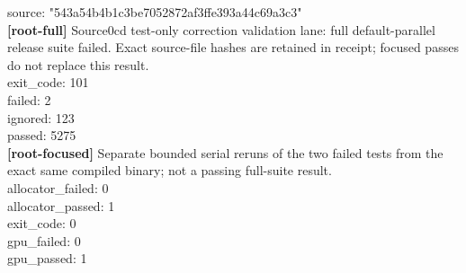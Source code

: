\documentclass[11pt]{article}
\begin{document}
source: "543a54b4b1c3be7052872af3ffe393a44c69a3c3"\\
\textbf{[root-full]} Source0cd test-only correction validation lane: full default-parallel release suite failed. Exact source-file hashes are retained in receipt; focused passes do not replace this result.\\
exit\_code: 101\\
failed: 2\\
ignored: 123\\
passed: 5275\\
\textbf{[root-focused]} Separate bounded serial reruns of the two failed tests from the exact same compiled binary; not a passing full-suite result.\\
allocator\_failed: 0\\
allocator\_passed: 1\\
exit\_code: 0\\
gpu\_failed: 0\\
gpu\_passed: 1\\
\end{document}
